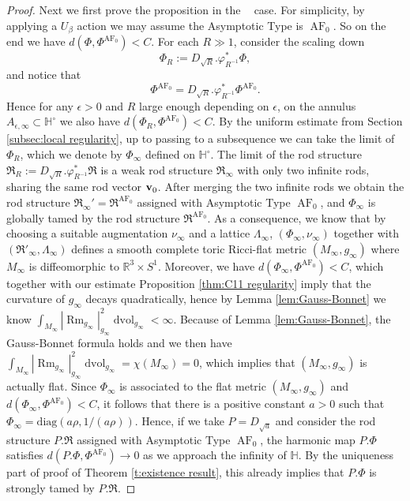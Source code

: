 \documentclass[a4paper,11pt]{amsart}
\theoremstyle{definition}
\numberwithin{equation}{section}
\newcommand{\dH}{\mathbb{H}}
\newcommand{\R}{\mathbb{R}}
\newcommand{\mR} {\mathfrak R}
\DeclareMathOperator{\dvol}{dvol}
\DeclareMathOperator{\Rm}{Rm}
\DeclareMathOperator{\bv}{{\bf v}}
\DeclareMathOperator{\AF}{AF}
\DeclareMathOperator{\AFa}{AF_\beta}
\begin{document}
\begin{proof}
    Next we first prove the proposition in the $\AFa$ case. For simplicity, by applying a $U_\beta$ action we may assume the Asymptotic Type is $\AF_0$. So on the end we have $d(\Phi,\Phi^{\AF_0})<C$. For each $R\gg1$, consider the scaling down 
    $$\Phi_R:=D_{\sqrt{R}}.\varphi_{R^{-1}}^*\Phi,$$
    and notice that 
    $$\Phi^{\AF_0}=D_{\sqrt{R}}.\varphi_{R^{-1}}^*\Phi^{\AF_0}.$$
    Hence for any $\epsilon>0$ and $R$ large enough depending on $\epsilon$, on the annulus $A_{\epsilon, \infty}\subset \dH^\circ$ we also have $d(\Phi_R,\Phi^{\AF_0})<C$. By the uniform estimate from Section \ref{subsec:local regularity}, up to passing to a subsequence we can take the limit of $\Phi_R$, which we denote by $\Phi_{\infty}$ defined on $\mathbb{H}^\circ$. The limit of the rod structure $\mR_R:=D_{\sqrt{R}}.\varphi_{R^{-1}}^*\mR$ is a weak rod structure $\mR_\infty$ with only two infinite rods, sharing the same rod vector $\bv_0$. After merging the two infinite rods we obtain the rod structure $\mR_\infty'=\mR^{\AF_0}$ assigned with Asymptotic Type $\AF_0$, and $\Phi_\infty$ is globally tamed by the rod structure $\mR^{\AF_0}$. As a consequence, we know that by choosing a suitable augmentation $\nu_\infty$ and a lattice $\Lambda_\infty$, $(\Phi_\infty,\nu_\infty)$ together with $(\mR'_\infty,\Lambda_\infty)$ defines a smooth complete toric Ricci-flat metric $(M_\infty,g_\infty)$ where $M_\infty$ is diffeomorphic to $\R^3\times S^1$. Moreover, we have  $d(\Phi_\infty,\Phi^{\AF_0})<C$, which together with our estimate Proposition \ref{thm:C11 regularity} imply that the curvature of $g_\infty$ decays quadratically, hence by Lemma \ref{lem:Gauss-Bonnet} we know $\int_{M_\infty}|\Rm_{g_\infty}|_{g_\infty}^2\dvol_{g_\infty}<\infty$. Because of Lemma \ref{lem:Gauss-Bonnet}, the Gauss-Bonnet formula holds and we then have $\int_{M_\infty}|\Rm_{g_\infty}|_{g_\infty}^2\dvol_{g_\infty}=\chi(M_\infty)=0$, which implies that $(M_\infty,g_\infty)$ is actually flat. Since $\Phi_\infty$ is associated to the flat metric $(M_\infty,g_\infty)$ and $d(\Phi_\infty,\Phi^{\AF_0})<C$, it follows that there is a positive constant $a>0$ such that $\Phi_\infty=\mathrm{diag}(a\rho,1/(a\rho))$. Hence, if we take $P=D_{\sqrt{a}}$ and consider the rod structure $P.\mR$ assigned with Asymptotic Type $\AF_0$, the harmonic map $P.\Phi$ satisfies $d(P.\Phi,\Phi^{\AF_0})\to0$ as we approach the infinity of $\mathbb{H}$. By the uniqueness part of proof of Theorem \ref{t:existence result}, this already implies that $P.\Phi$ is strongly tamed by $P.\mR$.



\end{proof}
\end{document}

